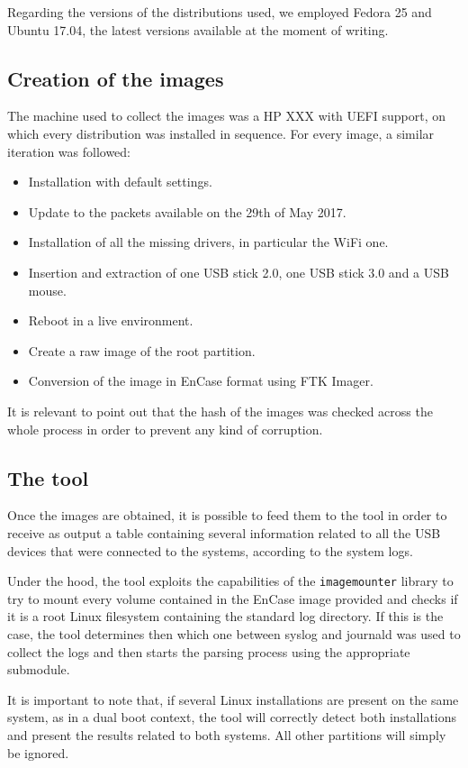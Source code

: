 \documentclass[a4paper]{article}
\begin{document}
Regarding the versions of the distributions used, we employed Fedora 25 and
Ubuntu 17.04, the latest versions available at the moment of writing.

\subsection{Creation of the images}
\label{sec:images}
The machine used to collect the images was a HP XXX with UEFI support, on which
every distribution was installed in sequence. For every image, a similar
iteration was followed:
\begin{itemize}
\item Installation with default settings.
\item Update to the packets available on the 29th of May 2017.
\item Installation of all the missing drivers, in particular the WiFi one.
\item Insertion and extraction of one USB stick 2.0, one USB stick 3.0 and a USB
	mouse.
\item Reboot in a live environment.
\item Create a raw image of the root partition.
\item Conversion of the image in EnCase format using FTK Imager.
\end{itemize}
It is relevant to point out that the hash of the images was checked across the
whole process in order to prevent any kind of corruption.

\subsection{The tool}\label{sec:tool}
Once the images are obtained, it is possible to feed them to the tool in order
to receive as output a table containing several information related to all the
USB devices that were connected to the systems, according to the system logs.

Under the hood, the tool exploits the capabilities of the \texttt{imagemounter}
library to try to mount every volume contained in the EnCase image provided and
checks if it is a root Linux filesystem containing the standard log directory.
If this is the case, the tool determines then which one between syslog and
journald was used to collect the logs and then starts the parsing process using
the appropriate submodule.

It is important to note that, if several Linux installations are present on the
same system, as in a dual boot context, the tool will correctly detect both
installations and present the results related to both systems. All other
partitions will simply be ignored.
\end{document}
